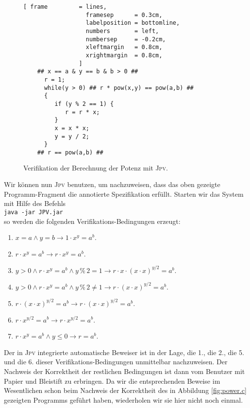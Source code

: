 \begin{figure}[!ht]
\centering
\begin{Verbatim}[ frame         = lines, 
                  framesep      = 0.3cm, 
                  labelposition = bottomline,
                  numbers       = left,
                  numbersep     = -0.2cm,
                  xleftmargin   = 0.8cm,
                  xrightmargin  = 0.8cm,
                ]
    ## x == a & y == b & b > 0 ##
      r = 1;
      while(y > 0) ## r * pow(x,y) == pow(a,b) ##
      {
         if (y % 2 == 1) {
            r = r * x;  
         }
         x = x * x;
         y = y / 2;
      }
    ## r == pow(a,b) ##
\end{Verbatim}
\vspace*{-0.3cm}
\caption{Verifikation der Berechnung der Potenz mit \textsc{Jpv}.}
\label{fig:Power.ver}
\end{figure}

Wir k\"onnen nun \textsc{Jpv} benutzen, um nachzuweisen, dass das oben gezeigte
Programm-Fragment die annotierte Spezifikation erf\"ullt.  Starten wir das System mit Hilfe
des Befehls
\\[0.2cm]
\hspace*{1.3cm}
\texttt{java -jar JPV.jar}
\\[0.2cm]
so werden die folgenden Verifi\-kations-Bedingungen erzeugt:
\begin{enumerate}
\item $x = a \wedge y = b \rightarrow 1 \cdot x^y = a^b$.
\item $r \cdot x^y = a^b \rightarrow r \cdot x^y = a^b$.
\item $y > 0 \wedge r \cdot x^y = a^b \wedge y \,\texttt{\%}\, 2 = 1 \rightarrow
        r \cdot x \cdot (x \cdot x)^{y / 2} = a^b$.
\item $y > 0 \wedge r \cdot x^y = a^b \wedge y \,\texttt{\%}\, 2 \not= 1    \rightarrow
        r \cdot (x \cdot x)^{y / 2} = a^b$.
\item $r \cdot (x \cdot x)^{y / 2} = a^b \rightarrow r \cdot (x \cdot x)^{y / 2} = a^b$.
\item $r \cdot x^{y / 2} = a^b    \rightarrow r \cdot x^{y / 2} = a^b$.
\item $r \cdot x^y = a^b \wedge y \leq 0    \rightarrow r = a^b$.
\end{enumerate}
Der in \textsc{Jpv} integrierte automatische Beweiser ist in der Lage, die 1., die 2., die
5. und die 6. dieser Verifikations-Bedingungen unmittelbar nachzuweisen.  Der Nachweis der
Korrektheit der restlichen Bedingungen ist dann vom Benutzer mit Papier und Bleistift zu erbringen.
Da wir die entsprechenden Beweise im Wesentlichen schon beim Nachweis der Korrektheit des in
Abbildung \ref{fig:power.c} gezeigten Programms gef\"uhrt haben, wiederholen wir sie hier
nicht noch einmal.


